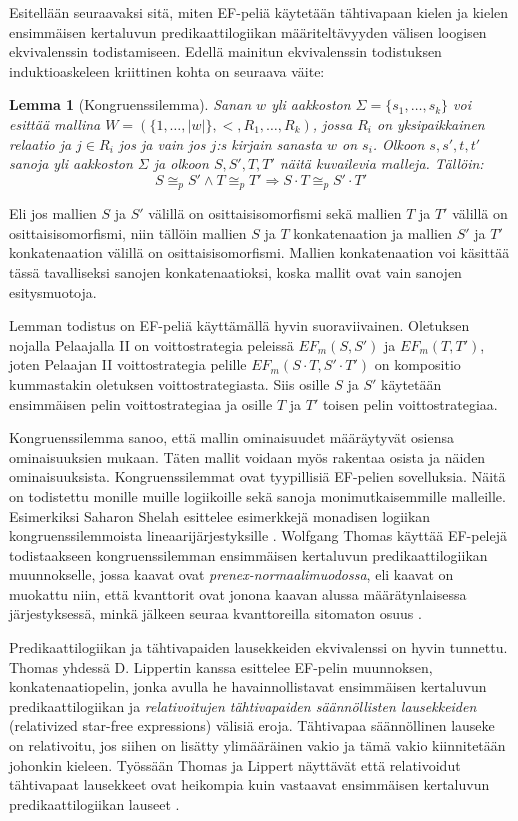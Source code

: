 \documentclass[finnish]{tktltiki2}
\newtheorem{lem}[lau]{Lemma}
\theoremstyle{definition}
\theoremstyle{remark}
\begin{document}
Esitellään seuraavaksi sitä, miten EF-peliä käytetään tähtivapaan kielen ja kielen ensimmäisen kertaluvun predikaattilogiikan määriteltävyyden välisen loogisen ekvivalenssin todistamiseen. Edellä mainitun ekvivalenssin todistuksen induktioaskeleen kriittinen kohta on seuraava väite:

\begin{lem}[Kongruenssilemma]
Sanan $w$ yli aakkoston $\Sigma = \{s_1, \ldots, s_k\}$ voi esittää mallina $W = (\{1, \ldots, |w|\}, <, R_1, \ldots, R_k)$, jossa $R_i$ on yksipaikkainen relaatio ja $j \in R_i$ jos ja vain jos $j$:s kirjain sanasta $w$ on $s_i$. Olkoon $s, s', t, t'$ sanoja yli aakkoston $\Sigma$ ja olkoon $S, S', T , T'$ näitä kuvailevia malleja. Tällöin: \[ S \cong_p S' \land T \cong_p T' \Longrightarrow S \cdot T \cong_p S' \cdot T' \]
\end{lem}
Eli jos mallien $S$ ja $S'$ välillä on osittaisisomorfismi sekä mallien $T$ ja $T'$ välillä on osittaisisomorfismi, niin tällöin mallien $S$ ja $T$ konkatenaation ja mallien $S'$ ja $T'$ konkatenaation välillä on osittaisisomorfismi. Mallien konkatenaation voi käsittää tässä tavalliseksi sanojen konkatenaatioksi, koska mallit ovat vain sanojen esitysmuotoja.

Lemman todistus on EF-peliä käyttämällä hyvin suoraviivainen. Oletuksen nojalla Pelaajalla II on voittostrategia peleissä $EF_m(S, S')$ ja $EF_m(T, T')$, joten Pelaajan II voittostrategia pelille $EF_m(S \cdot T, S' \cdot T')$ on kompositio kummastakin oletuksen voittostrategiasta. Siis osille $S$ ja $S'$ käytetään ensimmäisen pelin voittostrategiaa ja osille $T$ ja $T'$ toisen pelin voittostrategiaa.

Kongruenssilemma sanoo, että mallin ominaisuudet määräytyvät osiensa ominaisuuksien mukaan. Täten mallit voidaan myös rakentaa osista ja näiden ominaisuuksista. Kongruenssilemmat ovat tyypillisiä EF-pelien sovelluksia. Näitä on todistettu monille muille logiikoille sekä sanoja monimutkaisemmille malleille. Esimerkiksi Saharon Shelah esittelee esimerkkejä monadisen logiikan kongruenssilemmoista lineaarijärjestyksille \cite{She75}. Wolfgang Thomas käyttää EF-pelejä todistaakseen kongruenssilemman ensimmäisen kertaluvun predikaattilogiikan muunnokselle, jossa kaavat ovat \textit{prenex-normaalimuodossa}, eli kaavat on muokattu niin, että kvanttorit ovat jonona kaavan alussa määrätynlaisessa järjestyksessä, minkä jälkeen seuraa kvanttoreilla sitomaton osuus \cite{Tho84}.

Predikaattilogiikan ja tähtivapaiden lausekkeiden ekvivalenssi on hyvin tunnettu. Thomas yhdessä D. Lippertin kanssa esittelee EF-pelin muunnoksen, konkatenaatiopelin, jonka avulla he havainnollistavat ensimmäisen kertaluvun predikaattilogiikan ja \textit{relativoitujen tähtivapaiden säännöllisten lausekkeiden} (relativized star-free expressions) välisiä eroja. Tähtivapaa säännöllinen lauseke on relativoitu, jos siihen on lisätty ylimääräinen vakio ja tämä vakio kiinnitetään johonkin kieleen. Työssään Thomas ja Lippert näyttävät että relativoidut tähtivapaat lausekkeet ovat heikompia kuin vastaavat ensimmäisen kertaluvun predikaattilogiikan lauseet \cite{Lip88}.
\end{document}
